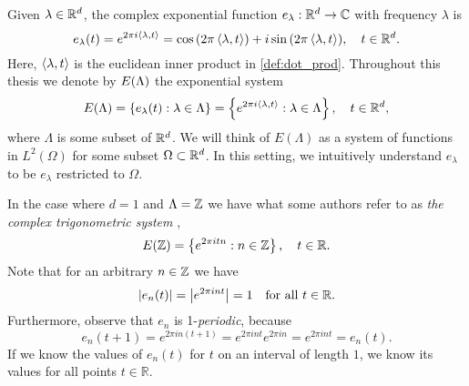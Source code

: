 \documentclass[../thesis.tex]{subfiles}
\begin{document}
Given $\lambda \in \mathbb{R}^d$, the complex exponential function $e_{\lambda}: \mathbb{R}^d \rightarrow \mathbb{C}$ with frequency $\lambda$ is 
\begin{equation*}
    e_{\lambda}(t) = e^{2 \pi i \langle \lambda, t \rangle} = \cos{\left(2 \pi \left \langle \lambda,t \right \rangle\right)} + i \sin{\left(2 \pi \left \langle \lambda,t \right \rangle\right)}, \quad t\in \mathbb{R}^d.
\end{equation*}
Here, $\left \langle \lambda, t \right \rangle$ is the euclidean inner product in \cref{def:dot_prod}. Throughout this thesis we denote by $E(\Lambda)$ the exponential system
\begin{equation*}
    E(\Lambda) = \left\{e_\lambda(t) : \lambda \in \Lambda\right\} = \left\{e^{2\pi i \left \langle \lambda,t \right \rangle} : \lambda \in \Lambda\right\}, \quad t\in \mathbb{R}^d,
\end{equation*}
where $\Lambda$ is some subset of $\mathbb{R}^d$. We will think of $E(\Lambda)$ as a system of functions in $L^2(\Omega)$ for some subset $\Omega \subset \mathbb{R}^d$. In this setting, we intuitively understand $e_\lambda$ to be $e_\lambda$ restricted to $\Omega$. %

\begin{example}
    In the case where $d=1$ and $\Lambda = \mathbb{Z}$ we have what some authors refer to as \emph{the complex trigonometric system} \cite{heilMetricsNormsInner2018} \cite{encyclopediaofmathematicsTrigonometricSystem},
    \begin{equation*}
        E(\mathbb{Z}) = \left\{e^{2\pi i t n} : n \in \mathbb{Z}\right\}, \quad t\in \mathbb{R}.
    \end{equation*}
    Note that for an arbitrary $n \in \mathbb{Z}$ we have
    \begin{equation*}
        \left|e_{n}(t) \right|= \left|e^{2 \pi i n t}\right| = 1 \quad \text{for all } t\in \mathbb{R}.
    \end{equation*}
    Furthermore, observe that $e_n$ is 1-\emph{periodic}, because
    \begin{equation*}
        e_n(t+1) = e^{2 \pi i n (t+1)} = e^{2 \pi i n t} e^{2 \pi i n} = e^{2 \pi i n t} = e_n(t).
    \end{equation*}
    If we know the values of $e_n(t)$ for $t$ on an interval of length $1$, we know its values for all points $t\in \mathbb{R}$. %
\end{example}
\end{document}
